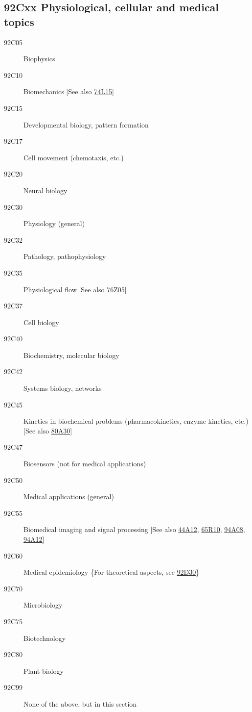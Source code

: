\subsection*{92Cxx  Physiological, cellular and medical topics }\label{92Cxx}
\begin{description}  
\item [92C05]\label{92C05} Biophysics
\item [92C10]\label{92C10} Biomechanics [See also \hyperref[74L15]{74L15}]
\item [92C15]\label{92C15} Developmental biology, pattern formation
\item [92C17]\label{92C17} Cell movement (chemotaxis, etc.)
\item [92C20]\label{92C20} Neural biology
\item [92C30]\label{92C30} Physiology (general)
\item [92C32]\label{92C32} Pathology, pathophysiology 
\item [92C35]\label{92C35} Physiological flow [See also \hyperref[76Z05]{76Z05}]
\item [92C37]\label{92C37} Cell biology
\item [92C40]\label{92C40} Biochemistry, molecular biology
\item [92C42]\label{92C42} Systems biology, networks
\item [92C45]\label{92C45} Kinetics in biochemical problems (pharmacokinetics, enzyme kinetics, etc.) [See also \hyperref[80A30]{80A30}]
\item [92C47]\label{92C47} Biosensors (not for medical applications)
\item [92C50]\label{92C50} Medical applications (general)
\item [92C55]\label{92C55} Biomedical imaging and signal processing [See also \hyperref[44A12]{44A12}, \hyperref[65R10]{65R10}, \hyperref[94A08]{94A08}, \hyperref[94A12]{94A12}]
\item [92C60]\label{92C60} Medical epidemiology \{For theoretical aspects, see \hyperref[92D30]{92D30}\}
\item [92C70]\label{92C70} Microbiology
\item [92C75]\label{92C75} Biotechnology
\item [92C80]\label{92C80} Plant biology
\item [92C99]\label{92C99} None of the above, but in this section
\end{description}
